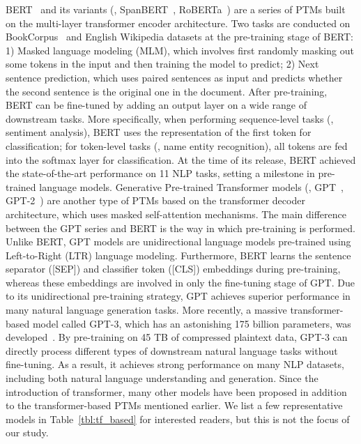 BERT~ and its variants (\eg, SpanBERT~, RoBERTa~) are a series of PTMs built on the multi-layer transformer encoder architecture. Two tasks are conducted on BookCorpus~ and English Wikipedia datasets at the pre-training stage of BERT: 1) Masked language modeling (MLM), which involves first randomly masking out some tokens in the input and then training the model to predict; 2) Next sentence prediction, which uses paired sentences as input and predicts whether the second sentence is the original one in the document. After pre-training, BERT can be fine-tuned by adding an output layer on a wide range of downstream tasks. More specifically, when performing sequence-level tasks (\eg, sentiment analysis), BERT uses the representation of the first token for classification; for token-level tasks (\eg, name entity recognition), all tokens are fed into the softmax layer for classification. At the time of its release, BERT achieved the state-of-the-art performance on 11 NLP tasks, setting a milestone in pre-trained language models. Generative Pre-trained Transformer models (\eg, GPT~, GPT-2~) are another type of PTMs based on the transformer decoder architecture, which uses masked self-attention mechanisms. The main difference between the GPT series and BERT is the way in which pre-training is performed. Unlike BERT, GPT models are unidirectional language models pre-trained using Left-to-Right (LTR) language modeling. Furthermore, BERT learns the sentence separator ([SEP]) and classifier token ([CLS]) embeddings during pre-training, whereas these embeddings are involved in only the fine-tuning stage of GPT. Due to its unidirectional pre-training strategy, GPT achieves superior performance in many natural language generation tasks.  More recently, a massive transformer-based model called GPT-3, which has an astonishing 175 billion parameters, was developed~. By pre-training on 45 TB of compressed plaintext data, GPT-3 can directly process different types of downstream natural language tasks without fine-tuning. As a result, it achieves strong performance on many NLP datasets, including both natural language understanding and generation. Since the introduction of transformer, many other models have been proposed in addition to the transformer-based PTMs mentioned earlier. We list a few representative models in Table~\ref{tbl:tf_based} for interested readers, but this is not the focus of our study.
